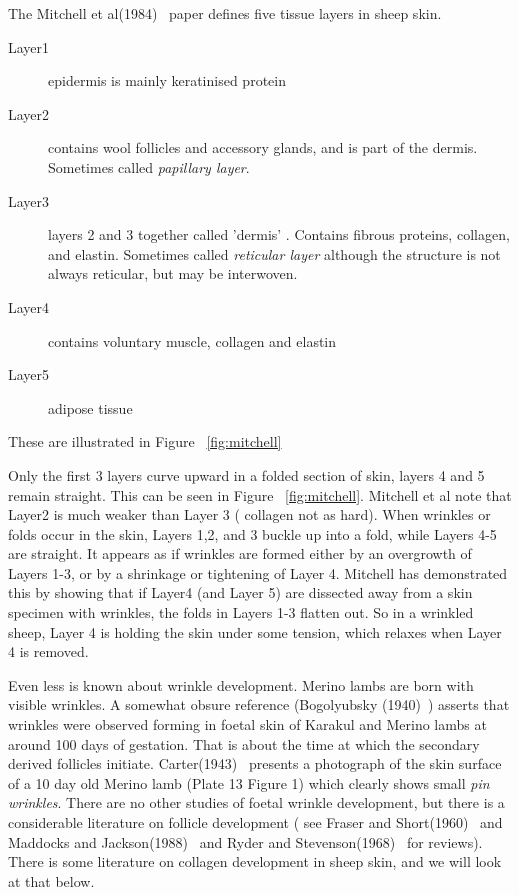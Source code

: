 \documentclass[titlepage]{article}  %
\begin{document}
The Mitchell et al(1984)~\cite{mitc:84} paper defines five tissue layers in sheep skin.
\begin{description}
\item[Layer1] epidermis is mainly keratinised protein
\item[Layer2] contains wool follicles and accessory glands, and is part of the dermis. Sometimes called {\em papillary layer}.
\item[Layer3] layers 2 and 3 together called 'dermis' . Contains fibrous proteins, collagen, and elastin. Sometimes called {\em reticular layer} although the structure is not always reticular, but may be interwoven.
\item[Layer4] contains voluntary muscle, collagen and elastin
\item[Layer5] adipose tissue
\end{description}
 These are illustrated in Figure ~\ref{fig:mitchell}

Only the first 3 layers curve upward in a folded section of skin, layers 4 and 5 remain straight. This can be seen in Figure ~\ref{fig:mitchell}. Mitchell et al note that Layer2 is much weaker than Layer 3 ( collagen not as hard). When wrinkles or folds occur in the skin, Layers 1,2, and 3 buckle up into a fold, while Layers 4-5 are straight. It appears as if wrinkles are formed either by an overgrowth of Layers 1-3, or by a shrinkage or tightening of Layer 4. Mitchell has demonstrated this by showing that if Layer4 (and Layer 5) are dissected away from a skin specimen with wrinkles, the folds in Layers 1-3 flatten out. So in a wrinkled sheep, Layer 4 is holding the skin under some tension, which relaxes when Layer 4 is removed.

Even less is known about wrinkle development. Merino lambs are born with visible wrinkles.  A somewhat obsure reference (Bogolyubsky (1940)~\cite{bogo:40}) asserts that wrinkles were observed forming in foetal skin of Karakul and Merino lambs at around 100 days of gestation. That is about the time at which the secondary derived follicles initiate. Carter(1943)~\cite{cart:43} presents a photograph of the skin surface of a 10 day old Merino lamb (Plate 13 Figure 1) which clearly shows small {\em pin wrinkles}. There are no other studies of foetal wrinkle development, but there is a considerable literature on follicle development ( see Fraser and Short(1960)~\cite{fras:60} and Maddocks and Jackson(1988)~\cite{madd:88} and Ryder and Stevenson(1968)~\cite{ryde:68} for reviews). There is some literature on collagen development in sheep skin, and we will look at that below.
\end{document}
